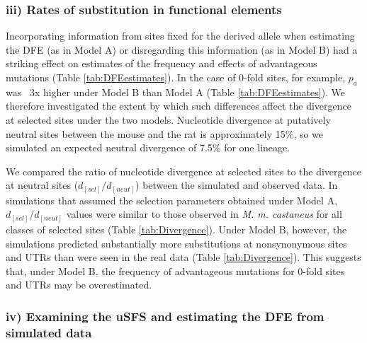 \subsubsection{iii) Rates of substitution in functional elements}

Incorporating information from sites fixed for the derived allele when estimating the DFE (as in Model A) or disregarding this information (as in Model B) had a striking effect on estimates of the frequency and effects of advantageous mutations (Table \ref{tab:DFEestimates}). In the case of 0-fold sites, for example, $p_a$ was ~3x higher under Model B than Model A (Table \ref{tab:DFEestimates}). We therefore investigated the extent by which such differences affect the divergence at selected sites under the two models. Nucleotide divergence at putatively neutral sites between the mouse and the rat is approximately 15\%, so we simulated an expected neutral divergence of 7.5\% for one lineage. 

We compared the ratio of nucleotide divergence at selected sites to the divergence at neutral sites ($d_[sel]/d_[neut]$) between the simulated and observed data. In simulations that assumed the selection parameters obtained under Model A, $d_[sel]/d_[neut]$ values were similar to those observed in \textit{M. m. castaneus} for all classes of selected sites (Table \ref{tab:Divergence}). Under Model B, however, the simulations predicted substantially more substitutions at nonsynonymous sites and UTRs than were seen in the real data (Table \ref{tab:Divergence}). This suggests that, under Model B, the frequency of advantageous mutations for 0-fold sites and UTRs may be overestimated.

\subsubsection{iv) Examining the uSFS and estimating the DFE from simulated data}

